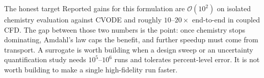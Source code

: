 \documentclass[11pt]{article}
\theoremstyle{plain}
\theoremstyle{definition}
\begin{document}
\begin{engbox}{The honest target}
Reported gains for this formulation are $\mathcal{O}(10^2)$ on isolated
chemistry evaluation against CVODE and roughly $10$--$20\times$ end-to-end in
coupled CFD. The gap between those two numbers is the point: once chemistry
stops dominating, Amdahl's law caps the benefit, and further speedup must come
from transport. A surrogate is worth building when a design sweep or an
uncertainty quantification study needs $10^5$--$10^6$ runs and tolerates
percent-level error. It is not worth building to make a single high-fidelity
run faster.
\end{engbox}
\end{document}
